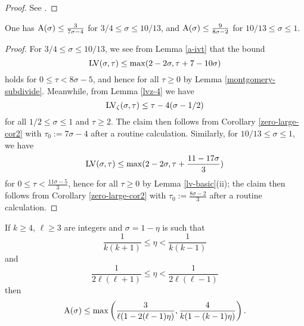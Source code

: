 \begin{proof} See \cite[(11.95)]{ivic}.
\end{proof}

\begin{corollary}\label{ivic-near-34}\cite[Theorem 11.5]{ivic}  One has $\mathrm{A}(\sigma) \leq \frac{3}{7\sigma-4}$ for $3/4 \leq \sigma \leq 10/13$, and $\mathrm{A}(\sigma) \leq \frac{9}{8\sigma-2}$ for $10/13 \leq \sigma \leq 1$.
\end{corollary}

\begin{proof}  For $3/4 \leq \sigma \leq 10/13$, we see from Lemma \ref{a-ivt} that the bound
$$ \mathrm{LV}(\sigma,\tau) \leq \max(2-2\sigma, \tau + 7 - 10\sigma )$$
holds for $0 \leq \tau < 8\sigma-5$, and hence for all $\tau \geq 0$ by Lemma \ref{montgomery-subdivide}.  Meanwhile, from Lemma \ref{lvz-4} we have
$$\mathrm{LV}_\zeta(\sigma,\tau) \leq \tau - 4 (\sigma-1/2)$$
for all $1/2 \leq \sigma \leq 1$ and $\tau \geq 2$. The claim then follows from Corollary
\ref{zero-large-cor2} with $\tau_0 := 7\sigma-4$ after a routine calculation.  Similarly, for $10/13 \leq \sigma \leq 1$, we have
$$ \mathrm{LV}(\sigma,\tau) \leq \max(2-2\sigma, \tau + \frac{11 - 17 \sigma}{3} )$$
for $0 \leq \tau < \frac{11\sigma-5}{3}$, hence for all $\tau \geq 0$ by Lemma \ref{lv-basic}(ii); the claim then follows from Corollary
\ref{zero-large-cor2} with $\tau_0 := \frac{8\sigma-2}{3}$ after a routine calculation.
\end{proof}


\begin{theorem}\label{pintz-density}\cite[Theorem 1]{pintz_density_2023}  If $k \geq 4$, $\ell \geq 3$ are integers and $\sigma = 1-\eta$ is such that
\begin{equation}\label{eta-b}
    \frac{1}{k(k+1)} \leq \eta < \frac{1}{k(k-1)}
\end{equation}
and
\begin{equation}\label{eta-l}
 \frac{1}{2\ell(\ell+1)} \leq \eta < \frac{1}{2\ell(\ell-1)}
\end{equation}
then
$$ \mathrm{A}(\sigma) \leq \max\left( \frac{3}{\ell(1-2(\ell-1)\eta)}, \frac{4}{k(1-(k-1)\eta)}\right).$$
\end{theorem}
\literature
{}

